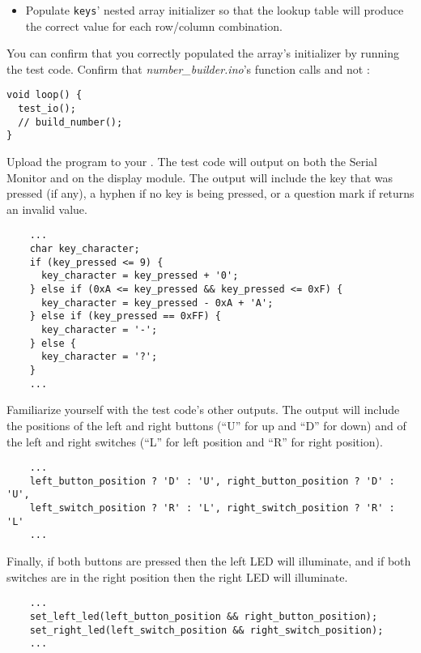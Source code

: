 \begin{itemize}
    \item Populate \lstinline{keys}' nested array initializer so that the
        lookup table will produce the correct value for each row/column
        combination.
\end{itemize}

You can confirm that you correctly populated the array's initializer by running the test code.
Confirm that \textit{number\_builder.ino}'s  function calls  and not :

\begin{lstlisting}
void loop() {
  test_io();
  // build_number();
}
\end{lstlisting}

Upload the program to your \developmentboard.
The test code will output on both the Serial Monitor and on the display module.
The output will include the key that was pressed (if any), a hyphen if no key is being pressed, or a question mark if  returns an invalid value.

\begin{lstlisting}
    ...
    char key_character;
    if (key_pressed <= 9) {
      key_character = key_pressed + '0';
    } else if (0xA <= key_pressed && key_pressed <= 0xF) {
      key_character = key_pressed - 0xA + 'A';
    } else if (key_pressed == 0xFF) {
      key_character = '-';
    } else {
      key_character = '?';
    }
    ...
\end{lstlisting}

Familiarize yourself with the test code's other outputs.
The output will include the positions of the left and right buttons (``U'' for up and ``D'' for down) and of the left and right switches (``L'' for left position and ``R'' for right position).

\begin{lstlisting}
    ...
    left_button_position ? 'D' : 'U', right_button_position ? 'D' : 'U',
    left_switch_position ? 'R' : 'L', right_switch_position ? 'R' : 'L'
    ...
\end{lstlisting}

Finally, if both buttons are pressed then the left LED will illuminate, and if both switches are in the right position then the right LED will illuminate.

\begin{lstlisting}
    ...
    set_left_led(left_button_position && right_button_position);
    set_right_led(left_switch_position && right_switch_position);
    ...
\end{lstlisting}



